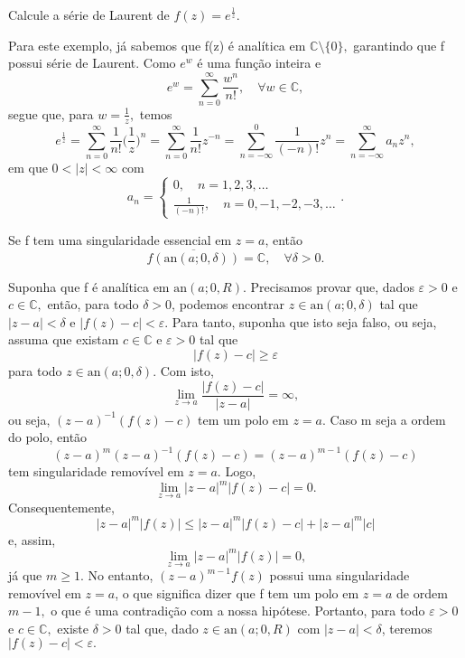 \documentclass[complex.tex]{subfiles}
\begin{document}
\begin{example}
	Calcule a série de Laurent de \(f(z) = e^{\frac{1}{z}}.\)

	Para este exemplo, já sabemos que f(z) é analítica em \(\mathbb{C}\setminus{\{0\}},\) garantindo que f possui série de Laurent.
	Como \(e^{w}\) é uma função inteira e
	\[
		e^{w} = \sum\limits_{n=0}^{\infty}\frac{w^{n}}{n!},\quad \forall w\in \mathbb{C},
	\]
	segue que, para \(w = \frac{1}{z},\) temos
	\[
		e^{\frac{1}{z}}=\sum\limits_{n=0}^{\infty}\frac{1}{n!}\biggl(\frac{1}{z}\biggr)^{n} = \sum\limits_{n=0}^{\infty}\frac{1}{n!}z^{-n} = \sum\limits_{n=-\infty}^{0}\frac{1}{(-n)!}z^{n} = \sum\limits_{n=-\infty}^{\infty}a_{n}z^{n},
	\]
	em que \(0 < |z| < \infty\) com
	\[
		a_{n}  = \left\{\begin{array}{ll}
			0,\quad n=1, 2, 3,\dotsc \\
			\frac{1}{(-n)!},\quad n = 0, -1, -2, -3, \dotsc
		\end{array}\right. .
	\]
\end{example}
\hypertarget{casorati-weierstrass}{
	\begin{theorem*}
		Se f tem uma singularidade essencial em \(z=a\), então
		\[
			\overline{f(\mathrm{an}(a; 0, \delta ))} = \mathbb{C},\quad \forall \delta > 0.
		\]
	\end{theorem*}}
\begin{proof*}
	Suponha que f é analítica em \(\mathrm{an}(a; 0, R).\) Precisamos provar que, dados \(\varepsilon > 0\) e \(c\in \mathbb{C},\) então, para todo \(\delta >0\),
	podemos encontrar \(z\in \mathrm{an}(a; 0, \delta )\) tal que \(|z-a| < \delta \) e \(|f(z) - c| < \varepsilon .\) Para tanto, suponha que isto seja falso, ou seja, assuma que existam
	\(c\in \mathbb{C}\) e \(\varepsilon > 0\) tal que
	\[
		|f(z) - c| \geq \varepsilon
	\]
	para todo \(z\in \mathrm{an}(a; 0, \delta )\). Com isto,
	\[
		\lim_{z\to a}\frac{|f(z)-c|}{|z-a|} = \infty,
	\]
	ou seja, \((z-a)^{-1}(f(z)-c)\) tem um polo em \(z=a.\) Caso m seja a ordem do polo, então
	\[
		(z-a)^{m}(z-a)^{-1}(f(z)-c) = (z-a)^{m-1}(f(z)-c)
	\]
	tem singularidade removível em \(z=a.\) Logo,
	\[
		\lim_{z\to a}|z-a|^{m}|f(z)-c| = 0.
	\]
	Consequentemente,
	\[
		|z-a|^{m}|f(z)|\leq |z-a|^{m}|f(z)-c| + |z-a|^{m}|c|
	\]
	e, assim,
	\[
		\lim_{z\to a}|z-a|^{m}|f(z)| = 0,
	\]
	já que \(m\geq 1.\) No entanto, \((z-a)^{m-1}f(z)\) possui uma singularidade removível em \(z=a\), o que significa dizer que
	f tem um polo em \(z=a\) de ordem \(m-1,\) o que é uma contradição com a nossa hipótese. Portanto, para todo \(\varepsilon >0\) e \(c\in \mathbb{C},\)
	existe \(\delta > 0\) tal que, dado \(z\in \mathrm{an}(a; 0, R)\) com \(|z-a| < \delta \), teremos \(|f(z) - c| < \varepsilon .\) \qedsymbol
\end{proof*}
\end{document}
